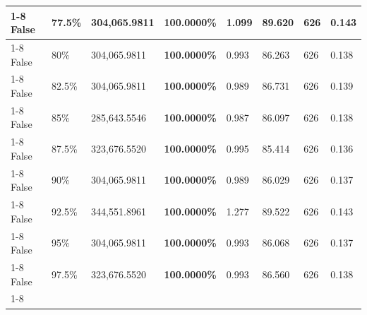 \begin{table}[H]
\begin{tabular}{lllrllll}
\cline{1-8} \cline{2-8}
False & 77.5\% & 304,065.9811 & \bfseries \color{red} 100.0000\% & 1.099 & 89.620 & 626 & 0.143 \\
\cline{1-8} \cline{2-8}
False & 80\% & 304,065.9811 & \bfseries \color{red} 100.0000\% & 0.993 & 86.263 & 626 & 0.138 \\
\cline{1-8} \cline{2-8}
False & 82.5\% & 304,065.9811 & \bfseries \color{red} 100.0000\% & 0.989 & 86.731 & 626 & 0.139 \\
\cline{1-8} \cline{2-8}
False & 85\% & \color{red} 285,643.5546 & \bfseries \color{red} 100.0000\% & 0.987 & 86.097 & 626 & 0.138 \\
\cline{1-8} \cline{2-8}
False & 87.5\% & 323,676.5520 & \bfseries \color{red} 100.0000\% & 0.995 & 85.414 & 626 & 0.136 \\
\cline{1-8} \cline{2-8}
False & 90\% & 304,065.9811 & \bfseries \color{red} 100.0000\% & 0.989 & 86.029 & 626 & 0.137 \\
\cline{1-8} \cline{2-8}
False & 92.5\% & 344,551.8961 & \bfseries \color{red} 100.0000\% & 1.277 & 89.522 & 626 & 0.143 \\
\cline{1-8} \cline{2-8}
False & 95\% & 304,065.9811 & \bfseries \color{red} 100.0000\% & 0.993 & 86.068 & 626 & 0.137 \\
\cline{1-8} \cline{2-8}
False & 97.5\% & 323,676.5520 & \bfseries \color{red} 100.0000\% & 0.993 & 86.560 & 626 & 0.138 \\
\cline{1-8} \cline{2-8}
\bottomrule
\end{tabular}
\end{table}
